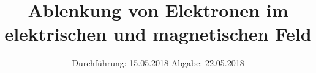 

\subject{VERSUCH 501/502}
\title{Ablenkung von Elektronen im elektrischen und magnetischen Feld}
\date{%
  Durchführung: 15.05.2018
  \hspace{3em}
  Abgabe: 22.05.2018
}



\maketitle
\thispagestyle{empty}
\tableofcontents
\newpage







\printbibliography{}


